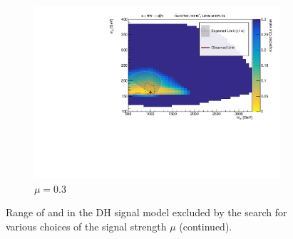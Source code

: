 \begin{figure}
\begin{subfigure}{0.48\textwidth}
    \includegraphics[width=\textwidth]{Figures/App_signal_strength/unblinded_mu0_3_nosig.pdf}
    \caption{\(\mu=0.3	\)}\label{fig:unblinded_0.3}
  \end{subfigure} \hspace{0.3em}
  \caption[]{Range of \ms and \mZp in the DH signal model excluded by the search for various choices of the signal strength \(\mu\) (continued).}
\end{figure}